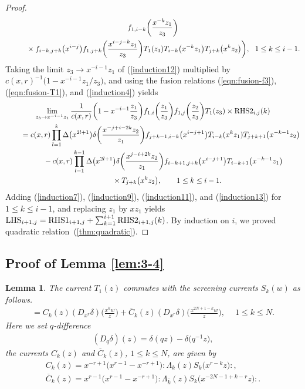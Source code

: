 \documentclass[pdftex]{sigma}
\numberwithin{equation}{section}
\newtheorem{Lemma}[Theorem]{Lemma}
\begin{document}
\begin{proof}
\begin{gather}
f_{1,i-k}\bigg(\frac{x^{-k}z_1}{z_3}\bigg)\notag
\\ \qquad \hphantom{=}
{}\times f_{i-k,j+k}\big(x^{i-j}\big)
f_{1,j+k}\bigg(\frac{x^{i-j-k}z_1}{z_3}\bigg)
T_1(z_3)T_{i-k}\big(x^{-k}z_1\big)T_{j+k}\big(x^kz_2\big)\bigg), \!\!\quad
1\leq k \leq i-1.\notag
\end{gather}
Taking the limit $z_3\to x^{-i-1}z_1$ of (\ref{induction12}) multiplied by $c(x,r)^{-1}\big(1-x^{-i-1}z_1/z_3\big)$, and using the fusion relations (\ref{eqn:fusion-f3}), (\ref{eqn:fusion-T1}), and (\ref{induction4}) yields
\begin{gather}
\lim_{z_3 \to x^{-i-1}z_1}\frac{1}{c(x,r)}\bigg(1-x^{-i-1}\frac{z_1}{z_3}\bigg)
f_{1,i}\bigg(\frac{z_1}{z_3}\bigg)
f_{1,j}\bigg(\frac{z_2}{z_3}\bigg)T_1(z_3)
\times {\rm RHS2}_{i, j}(k)\notag
\\ \qquad
{}=c(x,r)\prod_{l=1}^k \Delta\big(x^{2l+1}\big)
\delta\bigg(\frac{x^{-j+i-2k}z_2}{z_1}\bigg)
f_{j+k-1,i-k}\big(x^{i-j+1}\big)T_{i-k}(x^kz_1)T_{j+k+1}\big(x^{-k-1}z_2\big)\nonumber
\\ \qquad\hphantom{=}
{}-c(x,r)\prod_{l=1}^{k-1}\Delta\big(x^{2l+1}\big)
\delta\bigg(\frac{x^{j-i+2k}z_2}{z_1}\bigg)
f_{i-k+1,j+k}\big(x^{i-j+1}\big)T_{i-k+1}\big(x^{-k-1}z_1\big)\notag
\\ \qquad\hphantom{=+}
{}\times T_{j+k}\big(x^kz_2\big),\qquad 1\leq k \leq i-1.
\label{induction13}
\end{gather}
Adding (\ref{induction7}), (\ref{induction9}), (\ref{induction11}),
and (\ref{induction13}) for $1\leq k \leq i-1$, and replacing
$z_1$ by $xz_1$ yields ${\rm LHS}_{i+1,j}={\rm RHS1}_{i+1,j}+
\sum_{k=1}^{i+1}{\rm RHS2}_{i+1,j}(k)$.
By induction on $i$, we proved quadratic relation~(\ref{thm:quadratic}).
\end{proof}


\subsection{Proof of Lemma \ref{lem:3-4}}

\begin{Lemma}
\label{lemma:4-9}
The current $T_1(z)$ commutes with
the screening currents $S_k(w)$ as follows.
\begin{gather}
[T_1(z), S_k(w)]=C_k(z)
(D_{x^{r}}\delta)\bigg(\frac{x^{k}w}{z}\bigg)+\overline{C}_k(z)
(D_{x^{r}}\delta)\bigg(\frac{x^{2N+1-k}w}{z}\bigg),\quad\
1\leq k \leq N.
\label{eqn:commute-TS}
\end{gather}
Here we set $q$-difference
\begin{gather*}
(D_q\delta)(z)=\delta(qz)-\delta\big(q^{-1}z\big),
\end{gather*}
the currents $C_k(z)$ and $\overline{C}_k(z)$,
$1\leq k \leq N$, are given by
\begin{gather*}
C_k(z)=x^{-r+1}\big(x^{r-1}-x^{-r+1}\big){:}\Lambda_k(z)S_k\big(x^{r-k}z\big){:},
\\
\overline{C}_k(z)=x^{r-1}\big(x^{r-1}-x^{-r+1}\big)
{:}\Lambda_{\overline{k}}(z)S_k\big(x^{-2N{-}1+k-r}z\big){:}.
\end{gather*}
\end{Lemma}
\end{document}

